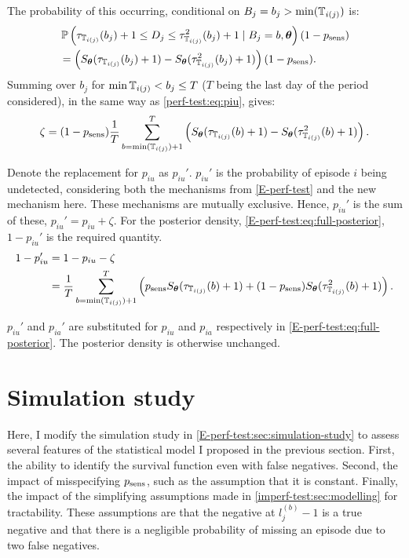 \documentclass[thesis.tex]{subfiles}
\begin{document}
The probability of this occurring, conditional on $B_j = b_j > \min(\mathbb{T}_{i(j)})$ is:
\begin{align}
&\operatorname{\mathbb{P}} \left(
    \tau_{\mathbb{T}_{i(j)}}(b_j) + 1 \leq D_j \leq \tau^2_{\mathbb{T}_{i(j)}}(b_j) + 1
    \mid B_j = b, \bm{\theta} \right) (1 - p_\text{sens}) \\
&= \left( S_{\bm{\theta}}(\tau_{\mathbb{T}_{i(j)}}(b_j) + 1) - S_{\bm{\theta}}(\tau^2_{\mathbb{T}_{i(j)}}(b_j) + 1) \right) (1 - p_\text{sens}).
\end{align}
Summing over $b_j$ for $\min \mathbb{T}_{i(j)} < b_j \leq T$ ($T$ being the last day of the period considered), in the same way as \cref{perf-test:eq:piu}, gives:
\begin{align}
\zeta = (1 - p_\text{sens})\frac{1}{T} \sum_{b=\min(\mathbb{T}_{i(j)}) + 1}^T \left( S_{\bm{\theta}}(\tau_{\mathbb{T}_{i(j)}}(b) + 1) - S_{\bm{\theta}}(\tau^2_{\mathbb{T}_{i(j)}}(b) + 1) \right).
\end{align}

Denote the replacement for $p_{iu}$ as $p_{iu}'$.
$p_{iu}'$ is the probability of episode $i$ being undetected, considering both the mechanisms from \cref{E-perf-test} and the new mechanism here.
These mechanisms are mutually exclusive.
Hence, $p_{iu}'$ is the sum of these, $p_{iu}' = p_{iu} + \zeta$.
For the posterior density, \cref{E-perf-test:eq:full-posterior}, $1 - p_{iu}'$ is the required quantity.
\begin{align}
1 - p_{iu}'
&= 1 - p_{iu} - \zeta \\
&= \frac{1}{T} \sum_{b=\min(\mathbb{T}_{i(j)}) + 1}^T \left( p_\text{sens} S_{\bm{\theta}}(\tau_{\mathbb{T}_{i(j)}}(b) + 1) + (1 - p_\text{sens}) S_{\bm{\theta}}(\tau^2_{\mathbb{T}_{i(j)}}(b) + 1)\right).
\label{imperf-test:eq:pit-prime}
\end{align}

$p_{iu}'$ and $p_{ia}'$ are substituted for $p_{iu}$ and $p_{ia}$ respectively in \cref{E-perf-test:eq:full-posterior}.
The posterior density is otherwise unchanged.

\section{Simulation study} \label{imperf-test:sec:sim-study-results}

Here, I modify the simulation study in \cref{E-perf-test:sec:simulation-study} to assess several features of the statistical model I proposed in the previous section.
First, the ability to identify the survival function even with false negatives.
Second, the impact of misspecifying $p_\text{sens}$, such as the assumption that it is constant.
Finally, the impact of the simplifying assumptions made in \cref{imperf-test:sec:modelling} for tractability.
These assumptions are that the negative at $l^{(b)}_j - 1$ is a true negative and that there is a negligible probability of missing an episode due to two false negatives.
\end{document}
